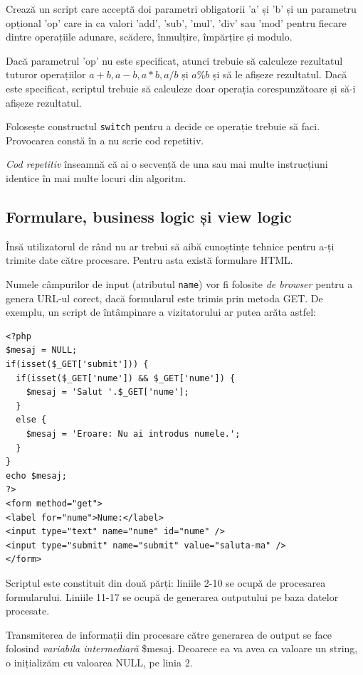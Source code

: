 \begin{Exercise}[title={Un calculator complet},difficulty=2]
Crează un script care acceptă doi parametri obligatorii 'a' și 'b' și un parametru
opțional 'op' care ia ca valori 'add', 'sub', 'mul', 'div' sau 'mod' pentru fiecare
dintre operațiile adunare, scădere, înmulțire, împărțire și modulo.

Dacă parametrul 'op' nu este specificat, atunci trebuie să calculeze rezultatul
tuturor operațiilor $a+b,a-b,a*b,a/b$ și $a\%b$ și să le afișeze rezultatul. Dacă este
specificat, scriptul trebuie să calculeze doar operația corespunzătoare și
să-i afișeze rezultatul.

Folosește constructul \texttt{switch} pentru a decide ce operație trebuie să faci.
Provocarea constă în a nu scrie cod repetitiv.

\textit{Cod repetitiv} înseamnă că ai o secvență de una sau mai multe instrucțiuni identice
în mai multe locuri din algoritm.
\end{Exercise}

\subsection{Formulare, business logic și view logic}

Însă utilizatorul de rând nu ar trebui să aibă cunoștințe tehnice pentru a-ți
trimite date către procesare. Pentru asta există formulare HTML.

Numele câmpurilor de input (atributul \texttt{name}) vor fi folosite \textit{de browser}
pentru a genera URL-ul corect, dacă formularul este
trimis prin metoda GET. De exemplu, un script de întâmpinare a
vizitatorului ar putea arăta astfel:
\begin{lstlisting}
<?php
$mesaj = NULL;
if(isset($_GET['submit'])) {
  if(isset($_GET['nume']) && $_GET['nume']) {
	$mesaj = 'Salut '.$_GET['nume'];
  }
  else {
	$mesaj = 'Eroare: Nu ai introdus numele.';
  }
}
echo $mesaj;
?>
<form method="get">
<label for="nume">Nume:</label>
<input type="text" name="nume" id="nume" />
<input type="submit" name="submit" value="saluta-ma" />
</form>
\end{lstlisting}
Scriptul este constituit din două părți: liniile 2-10 se ocupă de procesarea
formularului. Liniile 11-17 se ocupă de generarea outputului pe baza datelor
procesate.

Transmiterea de informații din procesare către generarea de output se face
folosind \textsl{variabila intermediară} \$mesaj. Deoarece ea va avea ca valoare un
string, o inițializăm cu valoarea NULL, pe linia 2.

